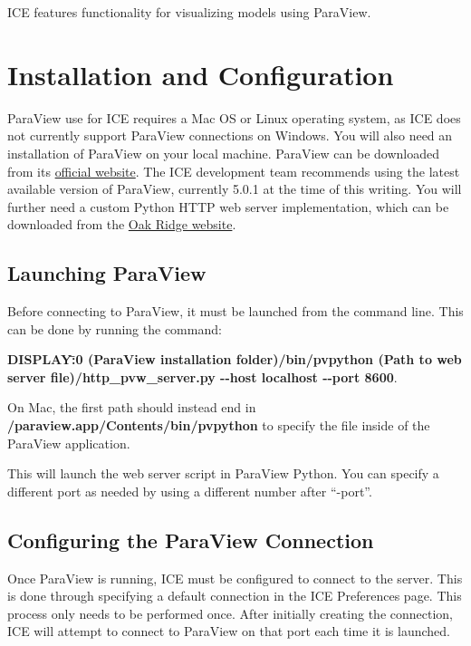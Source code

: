 ICE features functionality for visualizing models using ParaView.

\section{Installation and Configuration}

ParaView use for ICE requires a Mac OS or Linux operating system, as ICE does
not currently support ParaView connections on Windows. You will also need an
installation of ParaView on your local machine. ParaView can be downloaded from
its \href{http://www.paraview.org/download/}{official website}. The ICE
development team recommends using the latest available version of ParaView,
currently 5.0.1 at the time of this writing. You will further need a custom
Python HTTP web server implementation, which can be downloaded from the
\href{http://eclipseice.ornl.gov/downloads/paraview/scripts/http_pvw_server.py}{Oak
Ridge website}.

\subsection{Launching ParaView}  

Before connecting to ParaView, it must be launched from the command line. This
can be done by running the command:

\textbf{DISPLAY\=:0 (ParaView installation folder)/bin/pvpython (Path to web
server file)/http\_pvw\_server.py -{}-host localhost -{}-port 8600}.

On Mac, the first path should instead end in \newline
\textbf{/paraview.app/Contents/bin/pvpython} to specify the file inside of the
ParaView application.

This will launch the web server script in ParaView Python. You can specify a
different port as needed by using a different number after ``-port''.

\subsection{Configuring the ParaView Connection}

Once ParaView is running, ICE must be configured to connect to the server. This
is done through specifying a default connection in the ICE Preferences page.
This process only needs to be performed once. After initially creating the
connection, ICE will attempt to connect to ParaView on that port each time it is
launched.

